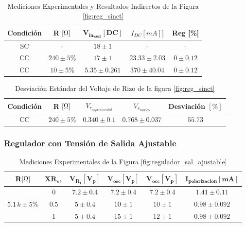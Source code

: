         \begin{table}[H]
          \centering
          \begin{tabular}{|c|c|c|c|c|}
            \hline
            \textbf{Condición} & \textbf{R} $\mathbf{[\ohm]}$ & $\mathbf{V_{in_{7805}} [DC]}$& $I_{DC} [mA]]$ & \textbf{Reg [\%]} \\
            \hline
            SC  & - & $18 \pm 1$& - & - \\
            \hline
            CC & $240 \pm 5\%$ & $17 \pm 1$ & $23.33 \pm 2.03$& $0 \pm 0.12$ \\
            \hline
            CC & $10 \pm 5\%$ & $5.35 \pm 0.261$ &$370 \pm 40.04$ & $0 \pm 0.12$ \\
            \hline
          \end{tabular}
          \caption{Mediciones Experimentales y Resultados Indirectos de la Figura \ref{fig:reg_sinct}}
          \label{exp_reg_sinct2}
        \end{table}

        \begin{table}[H]
            \centering
            \begin{tabular}{|c|c|c|c|c|}
                \hline
                Condición & R $[\ohm]$ & $V_{r_{experimental}}$ & $V_{r_{\text{teórico}}}$ & Desviación $[\%]$  \\ \hline
                 CC & $240 \pm 5\%$ & $0.340 \pm 0.1$  &  $0.768 \pm 0.037$ & $55.73$ \\ \hline
            \end{tabular}
            \caption{Desviación Estándar del Voltaje de Rizo de la figura \ref{fig:reg_sinct}}
            \label{tab:desv_reg_sinct}
        \end{table}


    \subsubsection{Regulador con Tensión de Salida Ajustable}

        \begin{table}[H]
          \centering
          \begin{tabular}{|c|c|c|c|c|c|}
            \hline
            $\mathbf{R [\ohm]}$ & $\mathbf{XR_{v1}}$ & $\mathbf{V_{R_1} [V_p]}$ & $\mathbf{V_{osc} [V_p]}$ & $\mathbf{V_{occ} [V_p]}$ & $\mathbf{I_{polarizacion} [mA]}$ \\\hline
            \multirow{3}{5cm}{\centering $5.1 \, k \pm 5 \%$} & $0$ & $7.2 \pm 0.4$ & $7.2 \pm 0.4$ & $7.2 \pm 0.4$ & $ 1.41 \pm 0.11$ \\
            & $0.5$ & $5 \pm 0.4$ & $10 \pm 1$ & $10 \pm 1$ & $0.98 \pm 0.092$ \\
            & $1$ & $5 \pm 0.4$ & $15 \pm 1$ & $12 \pm 1$ & $0.98 \pm 0.092$ \\
            \hline
          \end{tabular}
          \caption{Mediciones Experimentales de la Figura \ref{fig:regulador_sal_ajustable}}
          \label{tab:exp_regulador_sal_ajustable}
        \end{table}

